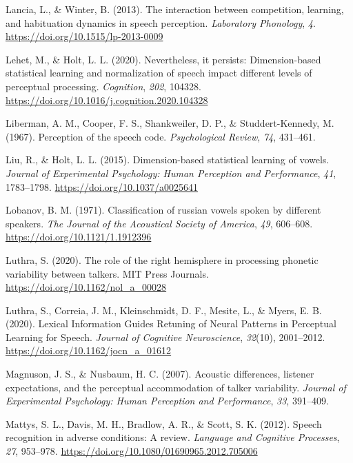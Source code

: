 \documentclass[
  11pt,
  english,
  man,floatsintext]{apa6}
\newlength{\cslhangindent}
\newlength{\cslentryspacingunit} %
\newenvironment{CSLReferences}[2] %
 {%
  \setlength{\parindent}{0pt}
  \ifodd #1
  \let\oldpar\par
  \def\par{\hangindent=\cslhangindent\oldpar}
  \fi
  \setlength{\parskip}{#2\cslentryspacingunit}
 }%
 {}
\begin{document}
\begin{CSLReferences}{1}{0}
\leavevmode{}%
Lancia, L., \& Winter, B. (2013). The interaction between competition, learning, and habituation dynamics in speech perception. \emph{Laboratory Phonology}, \emph{4}. \url{https://doi.org/10.1515/lp-2013-0009}

\leavevmode{}%
Lehet, M., \& Holt, L. L. (2020). Nevertheless, it persists: Dimension-based statistical learning and normalization of speech impact different levels of perceptual processing. \emph{Cognition}, \emph{202}, 104328. \url{https://doi.org/10.1016/j.cognition.2020.104328}

\leavevmode{}%
Liberman, A. M., Cooper, F. S., Shankweiler, D. P., \& Studdert-Kennedy, M. (1967). Perception of the speech code. \emph{Psychological Review}, \emph{74}, 431--461.

\leavevmode{}%
Liu, R., \& Holt, L. L. (2015). Dimension-based statistical learning of vowels. \emph{Journal of Experimental Psychology: Human Perception and Performance}, \emph{41}, 1783--1798. \url{https://doi.org/10.1037/a0025641}

\leavevmode{}%
Lobanov, B. M. (1971). Classification of russian vowels spoken by different speakers. \emph{The Journal of the Acoustical Society of America}, \emph{49}, 606--608. \url{https://doi.org/10.1121/1.1912396}

\leavevmode{}%
Luthra, S. (2020). The role of the right hemisphere in processing phonetic variability between talkers. MIT Press Journals. \url{https://doi.org/10.1162/nol_a_00028}

\leavevmode{}%
Luthra, S., Correia, J. M., Kleinschmidt, D. F., Mesite, L., \& Myers, E. B. (2020). {Lexical Information Guides Retuning of Neural Patterns in Perceptual Learning for Speech}. \emph{Journal of Cognitive Neuroscience}, \emph{32}(10), 2001--2012. \url{https://doi.org/10.1162/jocn_a_01612}

\leavevmode{}%
Magnuson, J. S., \& Nusbaum, H. C. (2007). Acoustic differences, listener expectations, and the perceptual accommodation of talker variability. \emph{Journal of Experimental Psychology: Human Perception and Performance}, \emph{33}, 391--409.

\leavevmode{}%
Mattys, S. L., Davis, M. H., Bradlow, A. R., \& Scott, S. K. (2012). Speech recognition in adverse conditions: A review. \emph{Language and Cognitive Processes}, \emph{27}, 953--978. \url{https://doi.org/10.1080/01690965.2012.705006}


\end{CSLReferences}
\end{document}
